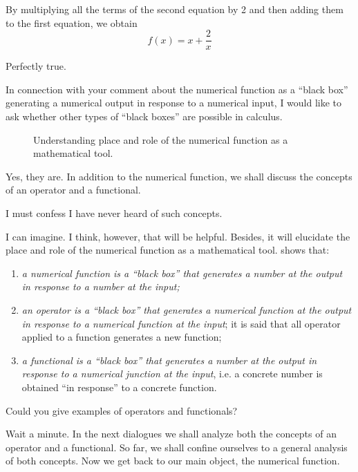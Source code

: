 {By multiplying all the terms of the second equation by 2 and then adding them to the first equation, we obtain
\begin{equation*}%
 f (x) = x + \frac{2}{x}
\end{equation*}


\athr Perfectly true.

\rdr In connection with your comment about the numerical function as a ``black box'' generating a numerical output in response to a numerical input, I would like to ask whether other types of ``black boxes'' are possible in calculus. 

\begin{figure}[!h]
\centering

\caption{Understanding place and role of the numerical function as a mathematical tool.}
\label{fig-12}
\end{figure}

\athr Yes, they are. In addition to the numerical function, we shall discuss the concepts of an operator and a functional. 

\rdr I must confess I have never heard of such concepts. 

\athr I can imagine. I think, however, that  will be helpful. Besides, it will elucidate the place and role of the numerical function as a mathematical tool.  shows that:
\begin{enumerate}[label=$\textcolor{IndianRed}{\blacktriangleright}$]

\item \emph{a numerical function is a \emph{``black box''} that generates a number at the output in response to a number at the input;}

\item \emph{an operator	is	a \emph{``black box''} that	generates	a	numerical function at the output in response to a numerical function at the input}; it is said that all operator applied to a function generates a new function;

\item \emph{a functional is a \emph{``black box''} that generates a number at the output in response to a numerical junction at the input}, i.e. a concrete number is obtained ``in response'' to a concrete function.
\end{enumerate}

\rdr Could you give examples of operators and functionals?

\athr Wait a minute. In the next dialogues we shall analyze both the concepts of an operator and a functional. So far, we shall confine ourselves to a general analysis of both concepts. Now we get back to our main object, the numerical function.

}
